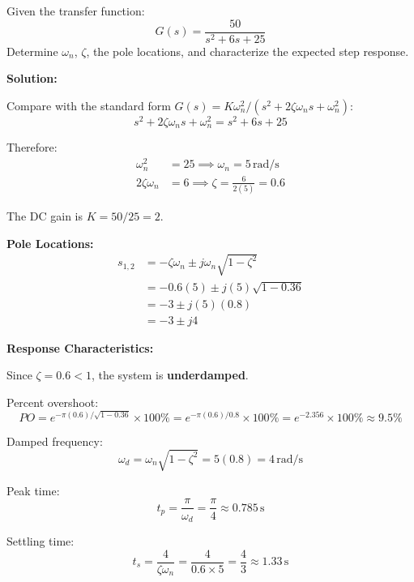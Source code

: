 \begin{examplebox}
Given the transfer function:
\begin{equation}
G(s) = \frac{50}{s^2 + 6s + 25}
\end{equation}
Determine $\omega_n$, $\zeta$, the pole locations, and characterize the expected step response.

\textbf{Solution:}

Compare with the standard form $G(s) = K\omega_n^2/(s^2 + 2\zeta\omega_n s + \omega_n^2)$:
\begin{equation}
s^2 + 2\zeta\omega_n s + \omega_n^2 = s^2 + 6s + 25
\end{equation}

Therefore:
\begin{align}
\omega_n^2 &= 25 \implies \boxed{\omega_n = 5\,\text{rad/s}} \\
2\zeta\omega_n &= 6 \implies \zeta = \frac{6}{2(5)} = \boxed{0.6}
\end{align}

The DC gain is $K = 50/25 = 2$.

\textbf{Pole Locations:}
\begin{align}
s_{1,2} &= -\zeta\omega_n \pm j\omega_n\sqrt{1-\zeta^2} \\
&= -0.6(5) \pm j(5)\sqrt{1-0.36} \\
&= -3 \pm j(5)(0.8) \\
&= \boxed{-3 \pm j4}
\end{align}

\textbf{Response Characteristics:}

Since $\zeta = 0.6 < 1$, the system is \textbf{underdamped}.

Percent overshoot:
\begin{equation}
PO = e^{-\pi(0.6)/\sqrt{1-0.36}} \times 100\% = e^{-\pi(0.6)/0.8} \times 100\% = e^{-2.356} \times 100\% \approx \boxed{9.5\%}
\end{equation}

Damped frequency:
\begin{equation}
\omega_d = \omega_n\sqrt{1-\zeta^2} = 5(0.8) = 4\,\text{rad/s}
\end{equation}

Peak time:
\begin{equation}
t_p = \frac{\pi}{\omega_d} = \frac{\pi}{4} \approx 0.785\,\text{s}
\end{equation}

Settling time:
\begin{equation}
t_s = \frac{4}{\zeta\omega_n} = \frac{4}{0.6 \times 5} = \frac{4}{3} \approx 1.33\,\text{s}
\end{equation}
\end{examplebox}

